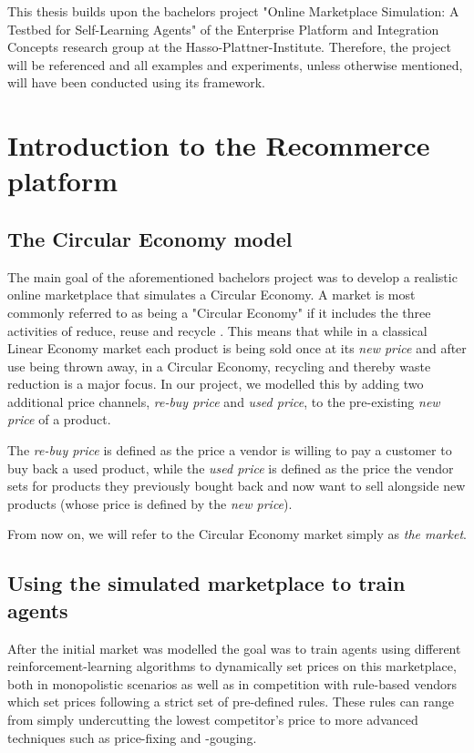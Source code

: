 \begin{jointwork}
	This thesis builds upon the bachelors project "Online Marketplace Simulation: A Testbed for Self-Learning Agents"
	of the Enterprise Platform and Integration Concepts research group at the Hasso-Plattner-Institute. Therefore, the project will
	be referenced and all examples and experiments, unless otherwise mentioned, will have been conducted using its framework.
\end{jointwork}

\section{Introduction to the Recommerce platform}

\subsection{The Circular Economy model}
The main goal of the aforementioned bachelors project was to develop a realistic online marketplace that simulates
a Circular Economy. A market is most commonly referred to as being a "Circular Economy" if it includes the three
activities of reduce, reuse and recycle \cite{circularEconomyDefinition}. This means that while in a classical
Linear Economy market each product is being sold once at its \emph{new price} and after use being thrown away,
in a Circular Economy, recycling and thereby waste reduction is a major focus. In our project, we modelled this by
adding two additional price channels, \emph{re-buy price} and \emph{used price}, to the pre-existing \emph{new price} of a product.

The \emph{re-buy price} is defined as the price a vendor is willing to pay a customer to buy back a used product, while the
\emph{used price} is defined as the price the vendor sets for products they previously bought back and now want to sell alongside new products
(whose price is defined by the \emph{new price}).

From now on, we will refer to the Circular Economy market simply as \emph{the market}.

\subsection{Using the simulated marketplace to train agents}

After the initial market was modelled the goal was to train agents using different reinforcement-learning algorithms
to dynamically set prices on this marketplace, both in monopolistic scenarios as well as in competition with rule-based vendors
which set prices following a strict set of pre-defined rules. These rules can range from simply undercutting the
lowest competitor's price to more advanced techniques such as price-fixing and -gouging.

